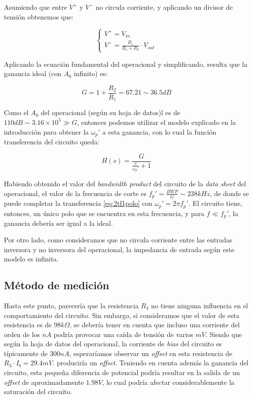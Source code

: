 \documentclass[../../main.tex]{subfiles}
\begin{document}
Asumiendo que entre $V^+$ y $V^-$ no circula corriente, y aplicando un divisor de tensi\'on obtenemos que:\par

 \[
	\left\{
 	\begin{array}{ll}
		V^+ = V_{in}\\
		V^- = \frac{R_1}{R_1+R_2} \cdot V_{out}
	\end{array}
	\right.
 \]

Aplicando la ecuaci\'on fundamental del operacional y simplificando, resulta que la ganancia ideal (con $A_0$ infinito) es:\par
\begin{equation} G = 1 + \frac{R_2}{R_1} = 67.21 \sim 36.5dB \end{equation}

Como el $A_0$ del operacional (seg\'un su hoja de datos)l es de $110dB \sim 3.16\times 10^5 \gg G$, entonces podemos utilizar el modelo explicado en la introducci\'on para obtener la $\omega_p'$ a esta ganancia, con lo cual la funci\'on transferencia del circuito queda:

\begin{equation} \label{eq:2tf1polo} H(s) = \frac{G}{\frac{s}{\omega_p'} +1} \end{equation}

Habiendo obtenido el valor del \textit{bandwidth product} del circuito de la \textit{data sheet} del operacional, el valor de la frecuencia de corte es $f_p'= \frac{BWP}{G} \sim 238kHz$, de donde se puede completar la transferencia \ref{eq:2tf1polo} con $\omega_p'=2\pi f_p'$. El circuito tiene, entonces, un \'unico polo que se encuentra en esta frecuencia, y para $f \ll f_p'$, la ganancia deber\'ia ser igual a la ideal.\par

Por otro lado, como consideramos que no circula corriente entre las entradas inversora y no inversora del operacional, la impedancia de entrada seg\'un este modelo es infinita. \par

\subsection{M\'etodo de medici\'on}

Hasta este punto, parecer\'ia que la resistencia $R_3$ no tiene ninguna influencia en el comportamiento del circuito. Sin embargo, si consideramos que el valor de esta resistencia es de $98k\Omega$, se deber\'ia tener en cuenta que incluso una corriente del orden de los $nA$ podr\'ia provocar una ca\'ida de tensi\'on de varios $mV$. Siendo que seg\'un la hoja de datos del operacional, la corriente de \textit{bias} del circuito es t\'ipicamente de $300nA$, esperar\'iamos observar un \textit{offset} en esta resistencia de $R_3 \cdot I_{b} = 29.4mV$. producir\'ia un \textit{offset}. Teniendo en cuenta adem\'as la ganancia del circuito, esta peque\~na diferencia de potencial podr\'ia resultar en la salida de un \textit{offset} de aproximadamente $1.98V$, lo cual podr\'ia afectar considerablemente la saturaci\'on del circuito. \par
\end{document}
